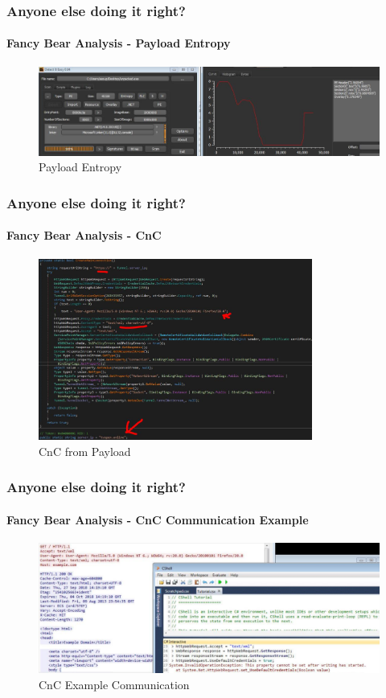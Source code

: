 \documentclass[aspectratio=169]{beamer}
\begin{document}
\begin{frame}
  \frametitle{Anyone else doing it right?}
  \framesubtitle{Fancy Bear Analysis - Payload Entropy}
  \begin{center}
    \begin{figure}
      \includegraphics[width=14cm,keepaspectratio]{fancy_bear_analysis_6}
      \caption{Payload Entropy}
    \end{figure}
  \end{center}
\end{frame}

\begin{frame}
  \frametitle{Anyone else doing it right?}
  \framesubtitle{Fancy Bear Analysis - CnC}
  \begin{center}
    \begin{figure}
      \includegraphics[width=9cm,keepaspectratio]{fancy_bear_analysis_7}
      \caption{CnC from Payload}
    \end{figure}
  \end{center}
\end{frame}

\begin{frame}
  \frametitle{Anyone else doing it right?}
  \framesubtitle{Fancy Bear Analysis - CnC Communication Example}
  \begin{center}
    \begin{figure}
      \includegraphics[width=14cm,keepaspectratio]{fancy_bear_analysis_8}
      \caption{CnC Example Communication}
    \end{figure}
  \end{center}
\end{frame}
\end{document}
